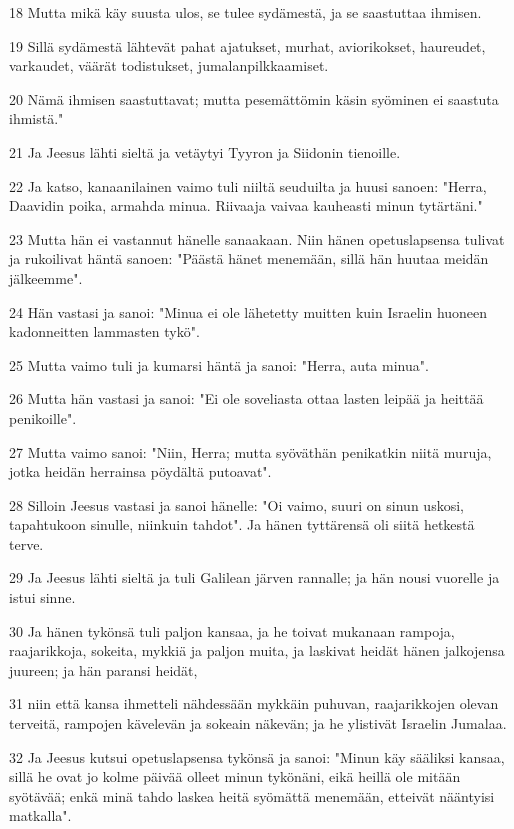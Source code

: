 \par 18 Mutta mikä käy suusta ulos, se tulee sydämestä, ja se saastuttaa ihmisen.
\par 19 Sillä sydämestä lähtevät pahat ajatukset, murhat, aviorikokset, haureudet, varkaudet, väärät todistukset, jumalanpilkkaamiset.
\par 20 Nämä ihmisen saastuttavat; mutta pesemättömin käsin syöminen ei saastuta ihmistä."
\par 21 Ja Jeesus lähti sieltä ja vetäytyi Tyyron ja Siidonin tienoille.
\par 22 Ja katso, kanaanilainen vaimo tuli niiltä seuduilta ja huusi sanoen: "Herra, Daavidin poika, armahda minua. Riivaaja vaivaa kauheasti minun tytärtäni."
\par 23 Mutta hän ei vastannut hänelle sanaakaan. Niin hänen opetuslapsensa tulivat ja rukoilivat häntä sanoen: "Päästä hänet menemään, sillä hän huutaa meidän jälkeemme".
\par 24 Hän vastasi ja sanoi: "Minua ei ole lähetetty muitten kuin Israelin huoneen kadonneitten lammasten tykö".
\par 25 Mutta vaimo tuli ja kumarsi häntä ja sanoi: "Herra, auta minua".
\par 26 Mutta hän vastasi ja sanoi: "Ei ole soveliasta ottaa lasten leipää ja heittää penikoille".
\par 27 Mutta vaimo sanoi: "Niin, Herra; mutta syöväthän penikatkin niitä muruja, jotka heidän herrainsa pöydältä putoavat".
\par 28 Silloin Jeesus vastasi ja sanoi hänelle: "Oi vaimo, suuri on sinun uskosi, tapahtukoon sinulle, niinkuin tahdot". Ja hänen tyttärensä oli siitä hetkestä terve.
\par 29 Ja Jeesus lähti sieltä ja tuli Galilean järven rannalle; ja hän nousi vuorelle ja istui sinne.
\par 30 Ja hänen tykönsä tuli paljon kansaa, ja he toivat mukanaan rampoja, raajarikkoja, sokeita, mykkiä ja paljon muita, ja laskivat heidät hänen jalkojensa juureen; ja hän paransi heidät,
\par 31 niin että kansa ihmetteli nähdessään mykkäin puhuvan, raajarikkojen olevan terveitä, rampojen kävelevän ja sokeain näkevän; ja he ylistivät Israelin Jumalaa.
\par 32 Ja Jeesus kutsui opetuslapsensa tykönsä ja sanoi: "Minun käy sääliksi kansaa, sillä he ovat jo kolme päivää olleet minun tykönäni, eikä heillä ole mitään syötävää; enkä minä tahdo laskea heitä syömättä menemään, etteivät nääntyisi matkalla".

